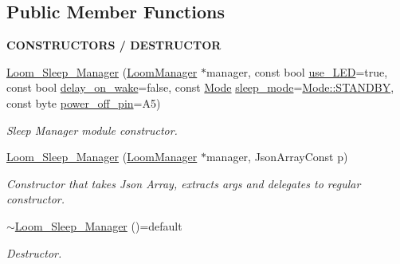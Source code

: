 \subsection*{Public Member Functions}
\begin{Indent}{\bf C\+O\+N\+S\+T\+R\+U\+C\+T\+O\+RS / D\+E\+S\+T\+R\+U\+C\+T\+OR}\par
\begin{DoxyCompactItemize}
\item 
\hyperlink{class_loom___sleep___manager_ae7bb3c7151e64825fc6ff0473f157175}{Loom\+\_\+\+Sleep\+\_\+\+Manager} (\hyperlink{class_loom_manager}{Loom\+Manager} $\ast$manager, const bool \hyperlink{class_loom___sleep___manager_ae9ffd9f5310fdac6d1df1f23741598a6}{use\+\_\+\+L\+ED}=true, const bool \hyperlink{class_loom___sleep___manager_a8404672e11d82bea2ba0934f1c197764}{delay\+\_\+on\+\_\+wake}=false, const \hyperlink{class_loom___sleep___manager_ab1cb2baaf00c386048490c3787a2de13}{Mode} \hyperlink{class_loom___sleep___manager_a3fdbc0a285480a155459ddc675a2482c}{sleep\+\_\+mode}=\hyperlink{class_loom___sleep___manager_ab1cb2baaf00c386048490c3787a2de13aeea559d5c56d48e94e586f7fe000c0b1}{Mode\+::\+S\+T\+A\+N\+D\+BY}, const byte \hyperlink{class_loom___sleep___manager_a46e360dc9b81c2a76e5f7f8d485dbae2}{power\+\_\+off\+\_\+pin}=A5)
\begin{DoxyCompactList}\small\item\em Sleep Manager module constructor. \end{DoxyCompactList}\item 
\hyperlink{class_loom___sleep___manager_a879ccf13274f65ac33a2f09758f1a9ca}{Loom\+\_\+\+Sleep\+\_\+\+Manager} (\hyperlink{class_loom_manager}{Loom\+Manager} $\ast$manager, Json\+Array\+Const p)
\begin{DoxyCompactList}\small\item\em Constructor that takes Json Array, extracts args and delegates to regular constructor. \end{DoxyCompactList}\item 
\hyperlink{class_loom___sleep___manager_a163e980ca26fa9b90b712fc80d754963}{$\sim$\+Loom\+\_\+\+Sleep\+\_\+\+Manager} ()=default
\begin{DoxyCompactList}\small\item\em Destructor. \end{DoxyCompactList}\end{DoxyCompactItemize}
\end{Indent}
